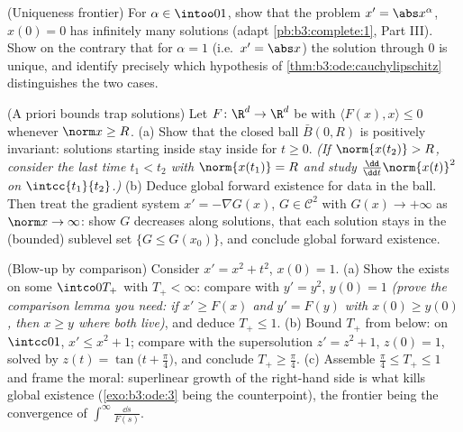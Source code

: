 \begin{exercise}[$\star\star$]\label{exo:b3:ode:9}
(Uniqueness frontier) For $\alpha \in \intoo01$, show that
the problem $x' = \abs x^{\alpha}$, $x(0) = 0$ has infinitely
many solutions (adapt \cref{pb:b3:complete:1}, Part III).
Show on the contrary that for $\alpha = 1$ (i.e.\ $x' = \abs
x$) the solution through $0$ is unique, and identify
precisely which hypothesis of
\cref{thm:b3:ode:cauchylipschitz} distinguishes the two
cases.
\end{exercise}

\begin{exercise}[$\star\star\star$]\label{exo:b3:ode:10}
(A priori bounds trap solutions) Let $F \colon \R^d \to \R^d$
be  with $\langle F(x), x\rangle \leq 0$
whenever $\norm x \geq R$.
(a) Show that the closed ball $\bar B(0, R)$ is positively
invariant: solutions starting inside stay inside for $t \geq
0$. \emph{(If $\norm{x(t_2)} > R$, consider the last time
$t_1 < t_2$ with $\norm{x(t_1)} = R$ and study
$\frac{\dd}{\dd t}\norm{x(t)}^2$ on $\intcc{t_1}{t_2}$.)}
(b) Deduce global forward existence for data in the ball.
Then treat the gradient system $x' = -\nabla G(x)$, $G \in
\mathcal C^2$ with $G(x) \to +\infty$ as $\norm x \to
\infty$: show $G$ decreases along solutions, that each
solution stays in the (bounded) sublevel set $\{G \leq
G(x_0)\}$, and conclude global forward existence.
\end{exercise}

\begin{exercise}[$\star\star$]\label{exo:b3:ode:11}
(Blow-up by comparison) Consider $x' = x^2 + t^2$, $x(0) =
1$.
(a) Show the  exists on some $\intco0{T_+}$
with $T_+ < \infty$: compare with $y' = y^2$, $y(0) = 1$
\emph{(prove the comparison lemma you need: if $x' \geq
F(x)$ and $y' = F(y)$ with $x(0) \geq y(0)$, then $x \geq
y$ where both live)}, and deduce $T_+ \leq 1$.
(b) Bound $T_+$ from below: on $\intcc01$, $x' \leq x^2 +
1$; compare with the supersolution $z' = z^2 + 1$, $z(0) =
1$, solved by $z(t) = \tan\bigl(t + \frac\pi4\bigr)$, and
conclude $T_+ \geq \frac\pi4$.
(c) Assemble $\frac\pi4 \leq T_+ \leq 1$ and frame the
moral: superlinear growth of the right-hand side is what
kills global existence (\cref{exo:b3:ode:3} being the
counterpoint), the frontier being the convergence of
$\int^{\infty}\frac{\dd s}{F(s)}$.
\end{exercise}

